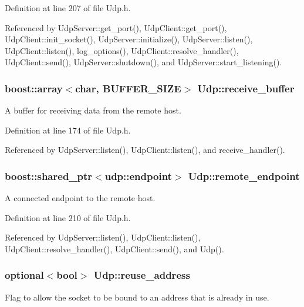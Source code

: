 Definition at line 207 of file Udp.h.



Referenced by UdpServer::get\_\-port(), UdpClient::get\_\-port(), UdpClient::init\_\-socket(), UdpServer::initialize(), UdpServer::listen(), UdpClient::listen(), log\_\-options(), UdpClient::resolve\_\-handler(), UdpClient::send(), UdpServer::shutdown(), and UdpServer::start\_\-listening().

\hypertarget{classUdp_a7f21cfeaaccb297124d7582607981afc}{
\subsubsection[{receive\_\-buffer}]{\setlength{\rightskip}{0pt plus 5cm}boost::array$<$char, {\bf BUFFER\_\-SIZE}$>$ {\bf Udp::receive\_\-buffer}}}
\label{classUdp_a7f21cfeaaccb297124d7582607981afc}
A buffer for receiving data from the remote host. 

Definition at line 174 of file Udp.h.



Referenced by UdpServer::listen(), UdpClient::listen(), and receive\_\-handler().

\hypertarget{classUdp_ae7fa8c26a933bf54f13f2230760a17e3}{
\subsubsection[{remote\_\-endpoint}]{\setlength{\rightskip}{0pt plus 5cm}boost::shared\_\-ptr$<$udp::endpoint$>$ {\bf Udp::remote\_\-endpoint}}}
\label{classUdp_ae7fa8c26a933bf54f13f2230760a17e3}
A connected endpoint to the remote host. 

Definition at line 210 of file Udp.h.



Referenced by UdpServer::listen(), UdpClient::listen(), UdpClient::resolve\_\-handler(), UdpClient::send(), and Udp().

\hypertarget{classUdp_a7572159d5d08e4e85e8a1eeba37eb1b9}{
\subsubsection[{reuse\_\-address}]{\setlength{\rightskip}{0pt plus 5cm}optional$<$bool$>$ {\bf Udp::reuse\_\-address}}}
\label{classUdp_a7572159d5d08e4e85e8a1eeba37eb1b9}
Flag to allow the socket to be bound to an address that is already in use. 

